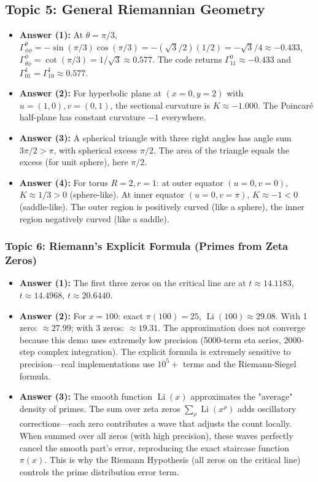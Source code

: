 \documentclass[11pt]{article}
\begin{document}
\subsection{Topic 5: General Riemannian Geometry}
\begin{itemize}
    \item \textbf{Answer (1):} At $\theta = \pi/3$, $\Gamma^\theta_{\phi\phi} = -\sin(\pi/3)\cos(\pi/3) = -(\sqrt{3}/2)(1/2) = -\sqrt{3}/4 \approx -0.433$, $\Gamma^\phi_{\theta\phi} = \cot(\pi/3) = 1/\sqrt{3} \approx 0.577$. The code returns $\Gamma^0_{11} \approx -0.433$ and $\Gamma^1_{01} = \Gamma^1_{10} \approx 0.577$.
    \item \textbf{Answer (2):} For hyperbolic plane at $(x=0, y=2)$ with $u=(1,0), v=(0,1)$, the sectional curvature is $K \approx -1.000$. The Poincar\'e half-plane has constant curvature $-1$ everywhere.
    \item \textbf{Answer (3):} A spherical triangle with three right angles has angle sum $3\pi/2 > \pi$, with spherical excess $\pi/2$. The area of the triangle equals the excess (for unit sphere), here $\pi/2$.
    \item \textbf{Answer (4):} For torus $R=2, r=1$: at outer equator $(u=0, v=0)$, $K \approx 1/3 > 0$ (sphere-like). At inner equator $(u=0, v=\pi)$, $K \approx -1 < 0$ (saddle-like). The outer region is positively curved (like a sphere), the inner region negatively curved (like a saddle).
\end{itemize}

\subsubsection{Topic 6: Riemann's Explicit Formula (Primes from Zeta Zeros)}
\begin{itemize}
    \item \textbf{Answer (1):} The first three zeros on the critical line are at $t \approx 14.1183$, $t \approx 14.4968$, $t \approx 20.6440$.
    \item \textbf{Answer (2):} For $x=100$: exact $\pi(100)=25$, $\operatorname{Li}(100)\approx 29.08$. With 1 zero: $\approx 27.99$; with 3 zeros: $\approx 19.31$. The approximation does not converge because this demo uses extremely low precision (5000-term eta series, 2000-step complex integration). The explicit formula is extremely sensitive to precision---real implementations use $10^5+$ terms and the Riemann-Siegel formula.
    \item \textbf{Answer (3):} The smooth function $\operatorname{Li}(x)$ approximates the "average" density of primes. The sum over zeta zeros $\sum_\rho \operatorname{Li}(x^\rho)$ adds oscillatory corrections---each zero contributes a wave that adjusts the count locally. When summed over all zeros (with high precision), these waves perfectly cancel the smooth part's error, reproducing the exact staircase function $\pi(x)$. This is why the Riemann Hypothesis (all zeros on the critical line) controls the prime distribution error term.
\end{itemize}
\end{document}
